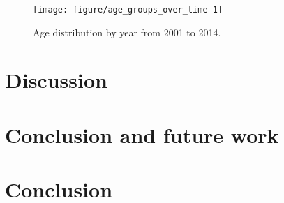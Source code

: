 \documentclass[12pt]{ociamthesis}\usepackage[]{graphicx}\usepackage[]{color}
\makeatletter
\def\maxwidth{ %
  \ifdim\Gin@nat@width>\linewidth
    \linewidth
  \else
    \Gin@nat@width
  \fi
}
\newenvironment{kframe}{%
 \def\at@end@of@kframe{}%
 \ifinner\ifhmode%
  \def\at@end@of@kframe{\end{minipage}}%
  \begin{minipage}{\columnwidth}%
 \fi\fi%
 \def\FrameCommand##1{\hskip\@totalleftmargin \hskip-\fboxsep
 \colorbox{shadecolor}{##1}\hskip-\fboxsep
     \hskip-\linewidth \hskip-\@totalleftmargin \hskip\columnwidth}%
 \MakeFramed {\advance\hsize-\width
   \@totalleftmargin\z@ \linewidth\hsize
   \@setminipage}}%
 {\par\unskip\endMakeFramed%
 \at@end@of@kframe}
\newenvironment{knitrout}{}{} %
\makeatother
\begin{document}
\begin{knitrout}
\color{fgcolor}\begin{kframe}


{\ttfamily\noindent\itshape\color{messagecolor}{\#\# Don't know how to automatically pick scale for object of type ts. Defaulting to continuous.}}\end{kframe}\begin{figure}

{\centering \texttt{[image: figure/age\_groups\_over\_time-1]} 

}

\caption[Age distribution by year from 2001 to 2014]{Age distribution by year from 2001 to 2014. }\label{fig:age_groups_over_time}
\end{figure}


\end{knitrout}

\chapter{Discussion}

\lipsum

\chapter{Conclusion and future work}

\lipsum

\chapter{Conclusion}


% 
\renewcommand{\bibname}{References}
\printbibliography
\end{document}
